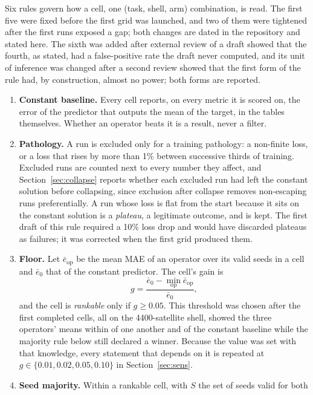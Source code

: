\documentclass[preprint,11pt,3p]{elsarticle}
\begin{document}
Six rules govern how a cell, one (task, shell, arm) combination, is read. The first five were
fixed before the first grid was launched, and two of them were tightened after the first runs
exposed a gap; both changes are dated in the repository and stated here. The sixth was added
after external review of a draft showed that the fourth, as stated, had a false-positive rate the
draft never computed, and its unit of inference was changed after a second review showed that
the first form of the rule had, by construction, almost no power; both forms are reported.
\begin{enumerate}
\item \textbf{Constant baseline.} Every cell reports, on every metric it is scored on, the error
  of the predictor that outputs the mean of the target, in the tables themselves. Whether an
  operator beats it is a result, never a filter.
\item \textbf{Pathology.} A run is excluded only for a training pathology: a non-finite loss, or
  a loss that rises by more than 1\% between successive thirds of training. Excluded runs are
  counted next to every number they affect, and Section~\ref{sec:collapse} reports whether each
  excluded run had left the constant solution before collapsing, since exclusion after collapse
  removes non-escaping runs preferentially. A run whose loss is flat from the start because it
  sits on the constant solution is a \emph{plateau}, a legitimate outcome, and is kept. The first
  draft of this rule required a 10\% loss drop and would have discarded plateaus as failures; it
  was corrected when the first grid produced them.
\item \textbf{Floor.} Let $\bar{e}_{\mathrm{op}}$ be the mean MAE of an operator over its valid
  seeds in a cell and $\bar{e}_{0}$ that of the constant predictor. The cell's gain is
  \begin{equation}
  g = \frac{\bar{e}_{0} - \min_{\mathrm{op}} \bar{e}_{\mathrm{op}}}{\bar{e}_{0}},
  \label{eq:gain}
  \end{equation}
  and the cell is \emph{rankable} only if $g \geq 0.05$. This threshold was chosen after the
  first completed cells, all on the 4400-satellite shell, showed the three operators' means
  within \numLargeSpreadMax{} of one another and of the constant baseline while the majority rule
  below still declared a winner. Because the value was set with that knowledge, every statement
  that depends on it is repeated at $g\in\{0.01, 0.02, 0.05, 0.10\}$ in Section~\ref{sec:sens}.
\item \textbf{Seed majority.} Within a rankable cell, with $S$ the set of seeds valid for both

\end{enumerate}
\end{document}
